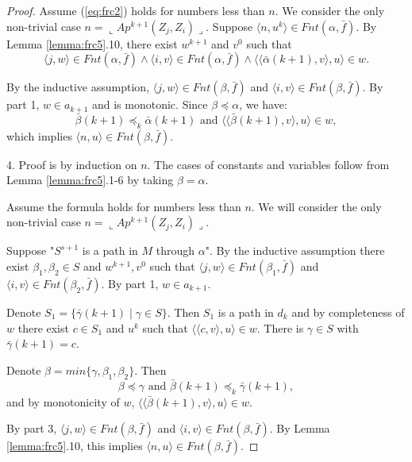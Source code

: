 \documentclass{asl}
\theoremstyle{definition}
\begin{document}
\begin{proof}
Assume (\ref{eq:frc2}) holds for numbers less than $n$. We consider the only non-trivial case $n=\llcorner Ap^{k+1}(Z_j,Z_i)\lrcorner$. Suppose $\langle n,u^k\rangle\in Fnt(\alpha,\bar{f})$. By Lemma \ref{lemma:frc5}.10, there exist $w^{k+1}$ and $v^0$ such that 
\[\langle j,w\rangle\in Fnt(\alpha,\bar{f})\wedge\langle i,v\rangle\in Fnt(\alpha,\bar{f})\wedge\langle\langle\bar{\alpha}(k+1),v\rangle,u\rangle\in w.\]

By the inductive assumption, $\langle j,w\rangle\in Fnt(\beta,\bar{f})$ and $\langle i,v\rangle\in Fnt(\beta,\bar{f})$. By part 1, $w\in a_{k+1}$ and is monotonic. Since $\beta\preceq\alpha$, we have:
\[\bar{\beta}(k+1)\preceq_k\bar{\alpha}(k+1)\text{ and }\langle\langle\bar{\beta}(k+1),v\rangle,u\rangle\in w,\] 
which implies $\langle n,u\rangle\in Fnt(\beta,\bar{f})$.

4. Proof is by induction on $n$. The cases of constants and variables follow from Lemma \ref{lemma:frc5}.1-6 by taking $\beta=\alpha$. 

Assume the formula holds for numbers less than $n$. We will consider the only non-trivial case $n=\llcorner Ap^{k+1}(Z_j,Z_i)\lrcorner$. 
\smallskip

Suppose "$S^{s+1}$ is a path in $M$ through $\alpha$". By the inductive assumption there exist $\beta_1,\beta_2\in S$ and $w^{k+1},v^0$ such that $\langle j,w\rangle\in Fnt(\beta_1,\bar{f})$ and $\langle i,v\rangle\in Fnt(\beta_2,\bar{f})$. By part 1, $w\in a_{k+1}$. 

Denote $S_1=\lbrace\bar{\gamma}(k+1)\mid\gamma\in S\rbrace$. Then $S_1$ is a path in $d_k$ and by completeness of $w$ there exist $c\in S_1$ and $u^k$ such that $\langle\langle c,v\rangle,u\rangle\in w$. There is $\gamma\in S$ with $\bar{\gamma}(k+1)=c$.


Denote $\beta=min\lbrace\gamma,\beta_1,\beta_2\rbrace$. Then
\[\beta\preceq\gamma\text{ and }\bar{\beta}(k+1)\preceq_k\bar{\gamma}(k+1),\] 
and by monotonicity of $w$,
$\langle\langle\bar{\beta}(k+1),v\rangle,u\rangle\in w$. 

By part 3, $\langle j,w\rangle\in Fnt(\beta,\bar{f})$ and $\langle i,v\rangle\in Fnt(\beta,\bar{f})$. By Lemma \ref{lemma:frc5}.10, this implies $\langle n,u\rangle\in Fnt(\beta,\bar{f})$.
\end{proof}
\end{document}
